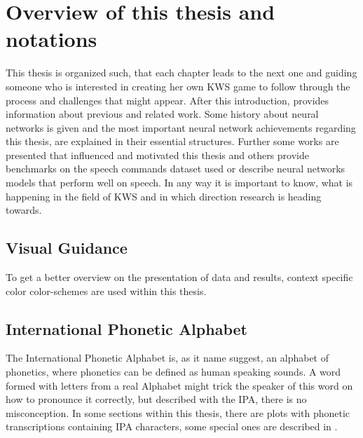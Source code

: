 
\section{Overview of this thesis and notations}\label{sec:intro_overview}

This thesis is organized such, that each chapter leads to the next one and guiding someone who is interested in creating her own KWS game to follow through the process and challenges that might appear.
After this introduction,  provides information about previous and related work.
Some history about neural networks is given and the most important neural network achievements regarding this thesis, are explained in their essential structures.
Further some works are presented that influenced and motivated this thesis and
others provide benchmarks on the speech commands dataset used or describe neural networks models that perform well on speech.
In any way it is important to know, what is happening in the field of KWS and in which direction research is heading towards.

\subsection{Visual Guidance}\label{sec:intro_overview_visual}
To get a better overview on the presentation of data and results, context specific color color-schemes are used within this thesis.


\subsection{International Phonetic Alphabet}\label{sec:intro_overview_ipa}
The International Phonetic Alphabet is, as it name suggest, an alphabet of phonetics, where phonetics can be defined as human speaking sounds.
A word formed with letters from a real Alphabet might trick the speaker of this word on how to pronounce it correctly, but described with the IPA, there is no misconception.
In some sections within this thesis, there are plots with phonetic transcriptions containing IPA characters, some special ones are described in .

